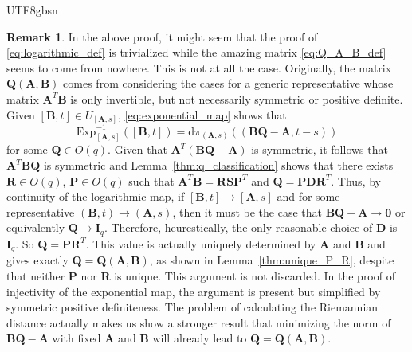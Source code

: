 \documentclass[12pt]{report}
\theoremstyle{plain}
\theoremstyle{definition}
\newtheorem{remark}[theorem]{Remark}
\begin{document}
\begin{CJK*}{UTF8}{gbsn}
\begin{remark}
In the above proof,
it might seem that
the proof of
\eqref{eq:logarithmic_def}
is trivialized while
the amazing matrix
\eqref{eq:Q_A_B_def} 
seems to come from nowhere.
This is not at all the case.
Originally,
the matrix $\bm{Q}(\bm{A},\bm{B})$ comes from 
considering the cases for a generic representative whose matrix 
$\bm{A}^T\bm{B}$
is only invertible, but not necessarily symmetric or positive definite.
Given
$[\bm{B},t] \in U_{[\bm{A},s]}$,
\eqref{eq:exponential_map} 
shows that 
\begin{equation*}
    \text{Exp}^{-1}_{[\bm{A},s]}([\bm{B},t]) 
    = \mathrm{d} \pi_{(\bm{A},s)}((\bm{B}\bm{Q}-\bm{A}, t-s))
  \end{equation*}
for some $\bm{Q}\in O(q)$.
Given that $\bm{A}^T(\bm{B}\bm{Q}-\bm{A})$ is symmetric,
it follows that $\bm{A}^T\bm{B}\bm{Q}$
is symmetric and Lemma~\ref{thm:q_classification}
shows that 
there exists $\bm{R} \in O(q)$, $\bm{P} \in O(q)$
such that
$\bm{A}^T\bm{B} = \bm{R}\bm{S}\bm{P}^T$
and $\bm{Q} = \bm{P}\bm{D}\bm{R}^T$.
Thus, by continuity of the logarithmic map,
if $[\bm{B},t] \to [\bm{A},s]$ and for some 
representative 
$(\bm{B},t) \to (\bm{A},s)$,
then
it must be the case that $\bm{B}\bm{Q}-\bm{A} \to \bm{0}$
or equivalently $\bm{Q} \to \bm{I}_q$.
Therefore, heurestically, the only reasonable choice of 
$\bm{D}$ is $\bm{I}_q$.
So $\bm{Q} = \bm{P}\bm{R}^T$.
This value is actually uniquely determined 
by $\bm{A}$ and $\bm{B}$ and gives exactly 
$\bm{Q} = \bm{Q}(\bm{A},\bm{B})$, as shown in
Lemma~\ref{thm:unique_P_R},
despite that neither $\bm{P}$ nor $\bm{R}$ is unique.
This argument is not discarded.
In the proof of injectivity of the exponential map,
the argument is present but simplified by symmetric positive definiteness.
The problem of calculating the Riemannian distance actually makes us
show a stronger result that minimizing the norm of $\bm{B}\bm{Q}-\bm{A}$
with fixed $\bm{A}$ and $\bm{B}$ will already lead to $\bm{Q} = \bm{Q}(\bm{A},\bm{B})$.
\end{remark}


\end{CJK*}
\end{document}
